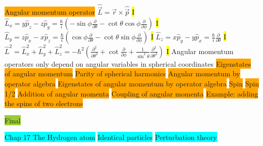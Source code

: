 \documentclass[fontsize=4pt]{scrartcl}
\begin{document}
\colorbox{Orange}{Angular momentum operator}
$\hat{\vec{L}} = \vec{r} \times \hat{\vec{p}}$
\hl{I}
$\hat{L}_x = y\hat{p}_z - z\hat{p}_y = \frac{\hbar}{i}(-\sin \phi \frac{\partial}{\partial \theta} - \cot \theta \cos \phi \frac{\partial}{\partial \phi})$
\hl{I}
$\hat{L}_y = z\hat{p}_x - x\hat{p}_z = \frac{\hbar}{i}(\cos \phi \frac{\partial}{\partial \theta} - \cot \theta \sin \phi \frac{\partial}{\partial \phi})$
\hl{I}
$\hat{L}_z = x\hat{p}_y - y\hat{p}_x = \frac{\hbar}{i}  \frac{\partial}{\partial \theta} $
\hl{I}
$\hat{L}^2 = \hat{L}_x^2 + \hat{L}_y^2 + \hat{L}_z^2 = -\hbar^2(\frac{\partial^2}{\partial \theta^2} + \cot \frac{\partial}{\partial \phi} + \frac{1}{\sin^2 \theta} \frac{\partial^2}{\partial \theta^2})$
\hl{I}
Angular momentum operators only depend on angular variables in spherical coordinates 
\colorbox{Orange}{Eigenstates of angular momentum}
\colorbox{Orange}{Parity of spherical harmonics}
\colorbox{Orange}{Angular momentum by operator algebra}
\colorbox{Orange}{Eigenstates of angular momentum by operator algebra}
\colorbox{Orange}{Spin}
\colorbox{Orange}{Spin 1/2}
\colorbox{Orange}{Addition of angular momenta}
\colorbox{Orange}{Coupling of angular momenta}
\colorbox{Orange}{Example: adding the spins of two electrons}







\colorbox{YellowGreen}{Final}

\colorbox{Cyan}{Chap 17 The Hydrogen atom}
\colorbox{Cyan}{Identical particles}
\colorbox{Cyan}{Perturbation theory}
\end{document}
